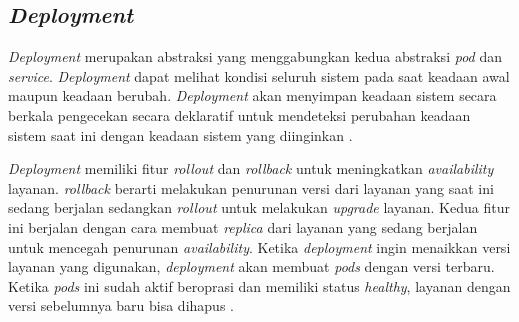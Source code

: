 \subsection{\textit{Deployment}}

\textit{Deployment} merupakan abstraksi yang menggabungkan kedua abstraksi \textit{pod} dan \textit{service}. \textit{Deployment} dapat melihat kondisi seluruh sistem pada saat keadaan awal maupun keadaan berubah. \textit{Deployment} akan menyimpan keadaan sistem secara berkala pengecekan secara deklaratif untuk mendeteksi perubahan keadaan sistem saat ini dengan keadaan sistem yang diinginkan \parencite{deployment}.

\textit{Deployment} memiliki fitur \textit{rollout} dan \textit{rollback} untuk meningkatkan \textit{availability} layanan. \textit{rollback} berarti melakukan penurunan versi dari layanan yang saat ini sedang berjalan sedangkan \textit{rollout} untuk melakukan \textit{upgrade} layanan. Kedua fitur ini berjalan dengan cara membuat \textit{replica} dari layanan yang sedang berjalan untuk mencegah penurunan \textit{availability}. Ketika \textit{deployment} ingin menaikkan versi layanan yang digunakan, \textit{deployment} akan membuat \textit{pods} dengan versi terbaru. Ketika \textit{pods} ini sudah aktif beroprasi dan memiliki status \textit{healthy}, layanan dengan versi sebelumnya baru bisa dihapus \parencite{deployment}.